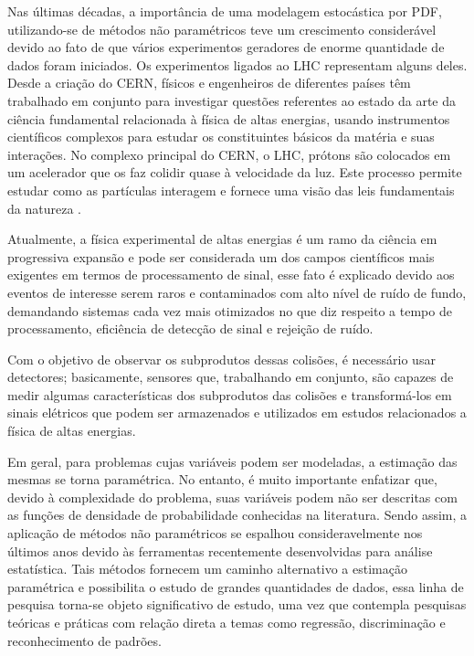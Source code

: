 Nas últimas décadas, a importância de uma modelagem estocástica por \ac{PDF}, utilizando-se de métodos não paramétricos teve um crescimento considerável devido ao fato de que vários experimentos geradores de enorme quantidade de dados foram iniciados.  Os experimentos ligados ao \ac{LHC} representam alguns deles. Desde a criação do \ac{CERN}, físicos e engenheiros de diferentes países têm trabalhado em conjunto para investigar questões referentes ao estado da arte da ciência fundamental relacionada à física de altas energias, usando instrumentos científicos complexos para estudar os constituintes básicos da matéria e suas interações. No complexo principal do \ac{CERN}, o \ac{LHC}, prótons são colocados em um acelerador que os faz colidir quase à velocidade da luz. Este processo permite estudar como as partículas interagem e fornece uma visão das leis fundamentais da natureza \cite{cernwebabout}.


Atualmente, a física experimental de altas energias é um ramo da ciência em progressiva expansão e pode ser considerada um dos campos científicos mais exigentes em termos de processamento de sinal, esse fato é explicado devido aos eventos de interesse serem raros e contaminados com alto nível de ruído de fundo, demandando sistemas cada vez mais otimizados no que diz respeito a tempo de processamento, eficiência de detecção de sinal e rejeição de ruído.

Com o objetivo de observar os subprodutos dessas colisões, é necessário usar detectores; basicamente, sensores que, trabalhando em conjunto, são capazes de medir algumas características dos subprodutos das colisões e transformá-los em sinais elétricos que podem ser armazenados e utilizados em estudos relacionados a física de altas energias.

Em geral, para problemas cujas variáveis podem ser modeladas, a estimação das mesmas se torna paramétrica. No entanto, é muito importante enfatizar que, devido à complexidade do problema, suas variáveis podem não ser descritas com as funções de densidade de probabilidade conhecidas na literatura. Sendo assim, a aplicação de métodos não paramétricos se espalhou consideravelmente nos últimos anos devido às ferramentas recentemente desenvolvidas para análise estatística. Tais métodos  fornecem um caminho alternativo a estimação paramétrica e possibilita o estudo de grandes quantidades de dados, essa linha de pesquisa torna-se objeto significativo de estudo, uma vez que contempla pesquisas teóricas e práticas com relação direta a temas como regressão, discriminação e reconhecimento de padrões. 


